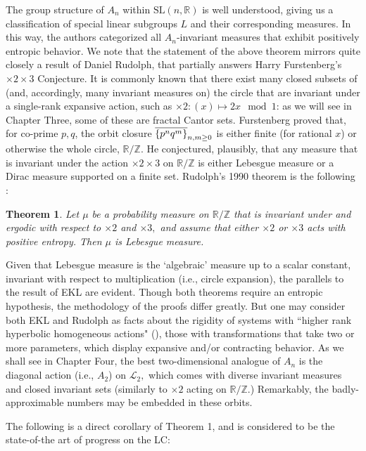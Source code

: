 \documentclass[12pt, letterpaper, oneside]{book}
\newcommand{\R}{\mathbb{R}}
\newcommand{\Z}{\mathbb{Z}}
\DeclarePairedDelimiter{\set}{\lbrace}{\rbrace}
\theoremstyle{plain}
\newtheorem{theorem}{Theorem}
\theoremstyle{definition}
\theoremstyle{remark}
\begin{document}
The group structure of $A_n$ within $\mbox{SL}(n,\R)$ is well understood, giving us a classification of special linear subgroups $L$ and their corresponding measures. In this way, the authors categorized all $A_n$-invariant measures that exhibit positively entropic behavior. We note that the statement of the above theorem mirrors quite closely a result of Daniel Rudolph, that partially answers Harry Furstenberg's $\times2\times3$ Conjecture. It is commonly known that there exist many closed subsets of (and, accordingly, many invariant measures on) the circle that are invariant under a single-rank expansive action, such as $\times2: (x) \mapsto 2x\mod1$: as we will see in Chapter Three, some of these are fractal Cantor sets. Furstenberg proved that, for co-prime $p,q$, the orbit closure $\overline{\set{p^nq^m}}_{n,m\geq0}$ is either finite (for rational $x$) or otherwise the whole circle, $\R/\Z.$ He conjectured, plausibly, that any measure that is invariant under the action $\times2\times3$ on $\R/\Z$ is either Lebesgue measure or a Dirac measure supported on a finite set. Rudolph's 1990 theorem is the following \cite{Rud90}:

\begin{theorem}
Let $\mu$ be a probability measure on $\R/\Z$ that is invariant under and ergodic with respect to $\times2$ and $\times3,$ and assume that either $\times 2$ or $\times3$ acts with positive entropy. Then $\mu$ is Lebesgue measure. 
\end{theorem}

Given that Lebesgue measure is the `algebraic' measure up to a scalar constant, invariant with respect to multiplication (i.e., circle expansion), the parallels to the result of EKL are evident. Though both theorems require an entropic hypothesis, the methodology of the proofs differ greatly. But one may consider both EKL and Rudolph as facts about the rigidity of systems with ``higher rank hyperbolic homogeneous actions" (\cite{ME06}), those with transformations that take two or more parameters, which display expansive and/or contracting behavior. As we shall see in Chapter Four, the best two-dimensional analogue of $A_n$ is the diagonal action (i.e., $A_2$) on $\mathcal{L}_2,$ which comes with diverse invariant measures and closed invariant sets (similarly to $\times2$ acting on $\R/\Z.$) Remarkably, the badly-approximable numbers may be embedded in these orbits. 

The following is a direct corollary of Theorem 1, and is considered to be the state-of-the art of progress on the LC: 
\end{document}
